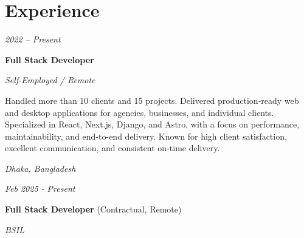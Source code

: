 \section{Experience}

    \begin{twocolentry}{
        
    \textit{2022 – Present}}
        \textbf{Full Stack Developer}
        
        \textit{Self-Employed / Remote}
    \end{twocolentry}

    \vspace{0.10 cm}
    \begin{onecolentry}
        \begin{highlights}
            \item Handled more than 10 clients and 15 projects. Delivered production-ready web and desktop applications for agencies, businesses, and individual clients. Specialized in React, Next.js, Django, and Astro, with a focus on performance, maintainability, and end-to-end delivery. Known for high client satisfaction, excellent communication, and consistent on-time delivery.
        \end{highlights}
    \end{onecolentry}


    \vspace{0.2 cm}

    \begin{twocolentry}{
    \textit{Dhaka, Bangladesh}
        
    \textit{Feb 2025 - Present}}
        \textbf{Full Stack Developer} (Contractual, Remote)
        
        \textit{BSIL}
    \end{twocolentry}

